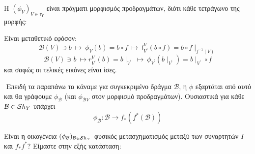 \begin{figure}[H]
    \centering
\end{figure}

\noindent Η $(\phi_V)_{V\in\tau_Y}$ είναι πράγματι μορφισμός προδραγμάτων, διότι κάθε τετράγωνο της μορφής:

\begin{figure}[H]
    \centering
\end{figure}

\noindent Είναι μεταθετικό εφόσον:
$$\mathcal{B}(V)\ni b \ \longmapsto \ \phi_V(b) = b \circ f \ \longmapsto \  l^V_{V^{\prime}}(b\circ f) = b\circ f\mid_{f^{-1}(V)}$$
$$\mathcal{B}(V)\ni b \ \longmapsto r^V_{V^{\prime}}(b) = b\mid_{V^{\prime}} \ \longmapsto \ \phi_{V^{\prime}}(b\mid_{V^{\prime}}) = b\mid_{V^{\prime}} \circ f$$ και σαφώς οι τελικές εικόνες είναι ίσες.

$ $\newline
Επειδή τα παραπάνω τα κάναμε για συγκεκριμένο δράγμα $\mathcal{B}$, η $\phi$ εξαρτάται από αυτό και θα γράφουμε $\phi_{\mathcal{B}}$ (και $\phi_{\mathcal{B}V}$ στον μορφισμό προδραγμάτων). Ουσιαστικά για κάθε $\mathcal{B} \in \mathcal{S} h_Y$ υπάρχει 
$$\phi_{\mathcal{B}} : \mathcal{B} \longrightarrow f_*(f^*(\mathcal{B}))$$


\noindent Είναι η οικογένεια $(\phi_{\mathcal B})_{\mathcal B \in \mathcal{S} h_Y}$ φυσικός μετασχηματισμός μεταξύ των συναρτητών $I$ και $f_*f^*$? Είμαστε στην εξής κατάσταση:

